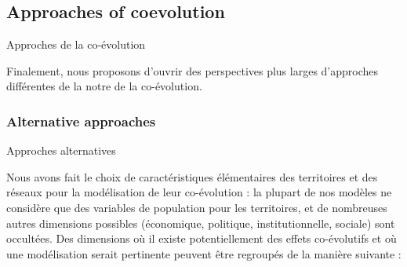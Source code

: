 \subsection{Approaches of coevolution}{Approches de la co-évolution}

Finalement, nous proposons d'ouvrir des perspectives plus larges d'approches différentes de la notre de la co-évolution.


\subsubsection{Alternative approaches}{Approches alternatives}


Nous avons fait le choix de caractéristiques élémentaires des territoires et des réseaux pour la modélisation de leur co-évolution : la plupart de nos modèles ne considère que des variables de population pour les territoires, et de nombreuses autres dimensions possibles (économique, politique, institutionnelle, sociale) sont occultées. Des dimensions où il existe potentiellement des effets co-évolutifs et où une modélisation serait pertinente peuvent être regroupés de la manière suivante :

